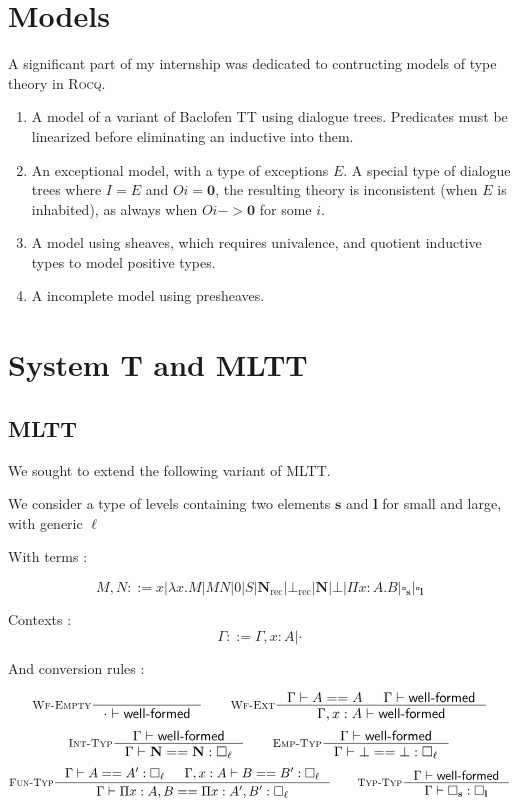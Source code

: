 \documentclass{article}
\DeclareMathOperator{\rec}{rec}
\newcommand{\0}{\mathbf{0}}
\newcommand{\1}{\mathbf{1}}
\newcommand{\nat}{\mathbf{N}}
\newcommand{\Wf}{\textsf{well-formed}}
\newcommand{\slvl}{\mathbf{s}}
\newcommand{\llvl}{\mathbf{l}}
\begin{document}
\section{Models}

A significant part of my internship was dedicated to contructing models of type theory in \textsc{Rocq}.

\begin{enumerate}
    \item A model of a variant of Baclofen TT using dialogue trees. Predicates must be linearized before eliminating an inductive into them.
    \item An exceptional model, with a type of exceptions $E$. A special type of dialogue trees where $I = E$ and $O i = \mathbf{0}$, the resulting theory is inconsistent (when $E$ is inhabited), as always when $O i -> \mathbf{0}$ for some $i$.
    \item A model using sheaves, which requires univalence, and quotient inductive types to model positive types.
    \item A incomplete model using presheaves.
\end{enumerate}


\section{System T and MLTT}
\subsection{MLTT}
We sought to extend the following variant of MLTT.

We consider a type of levels containing two elements $\slvl$ and $\llvl$ for small and large, with generic $\ell$

With terms :

$$ M,N ::= x | \lambda x. M | MN | 0 | S | \nat_{\rec} | \bot_{\rec} | \nat | \bot | \Pi x :A.B | \square_\slvl | \square_\llvl$$


Contexts :
$$ \Gamma ::= \Gamma, x : A | \cdot $$

And conversion rules :

$$
    \inference[\textsc{Wf-Empty}]{}{\cdot |- \Wf} \qquad
    \inference[\textsc{Wf-Ext}]{\Gamma |- A == A & \Gamma |- \Wf}{ \Gamma, x : A |- \Wf}
$$
$$
    \inference[\textsc{Int-Typ}]{\Gamma |- \Wf}{\Gamma |- \nat == \nat : \square_\ell} \qquad
    \inference[\textsc{Emp-Typ}]{\Gamma |- \Wf}{\Gamma |- \bot == \bot : \square_\ell}
$$
$$
    \inference[\textsc{Fun-Typ}]{\Gamma |- A == A' : \square_\ell & \Gamma, x : A |- B == B' : \square_\ell}{\Gamma |- \Pi x  : A, B == \Pi x: A', B' : \square_\ell} \qquad
    \inference[\textsc{Typ-Typ}]{\Gamma |- \Wf}{\Gamma |- \square_\slvl : \square_\llvl}
$$
\end{document}
